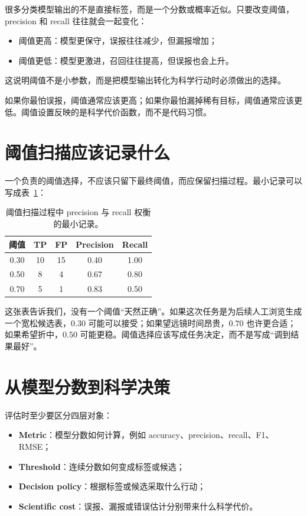 很多分类模型输出的不是直接标签，而是一个分数或概率近似。只要改变阈值，precision 和 recall 往往就会一起变化：

\begin{itemize}
    \item 阈值更高：模型更保守，误报往往减少，但漏报增加；
    \item 阈值更低：模型更激进，召回往往提高，但误报也会上升。
\end{itemize}

这说明阈值不是小参数，而是把模型输出转化为科学行动时必须做出的选择。

\begin{protip}[阈值本质上编码了错误代价]
如果你最怕误报，阈值通常应该更高；如果你最怕漏掉稀有目标，阈值通常应该更低。阈值设置反映的是科学代价函数，而不是代码习惯。
\end{protip}

\section{阈值扫描应该记录什么}

一个负责的阈值选择，不应该只留下最终阈值，而应保留扫描过程。最小记录可以写成表~\ref{tab:ch20_threshold_scan_record}：

\begin{table}[htbp]
\centering
\begin{tabular}{ccccc}
\toprule
阈值 & TP & FP & Precision & Recall \\
\midrule
0.30 & 10 & 15 & 0.40 & 1.00 \\
0.50 & 8 & 4 & 0.67 & 0.80 \\
0.70 & 5 & 1 & 0.83 & 0.50 \\
\bottomrule
\end{tabular}
\caption{阈值扫描过程中 precision 与 recall 权衡的最小记录。}
\label{tab:ch20_threshold_scan_record}
\end{table}

这张表告诉我们，没有一个阈值“天然正确”。如果这次任务是为后续人工浏览生成一个宽松候选表，$0.30$ 可能可以接受；如果望远镜时间昂贵，$0.70$ 也许更合适；如果希望折中，$0.50$ 可能更稳。阈值选择应该写成任务决定，而不是写成“调到结果最好”。

\section{从模型分数到科学决策}

评估时至少要区分四层对象：

\begin{itemize}
    \item \textbf{Metric}：模型分数如何计算，例如 accuracy、precision、recall、F1、RMSE；
    \item \textbf{Threshold}：连续分数如何变成标签或候选；
    \item \textbf{Decision policy}：根据标签或候选采取什么行动；
    \item \textbf{Scientific cost}：误报、漏报或错误估计分别带来什么科学代价。
\end{itemize}

